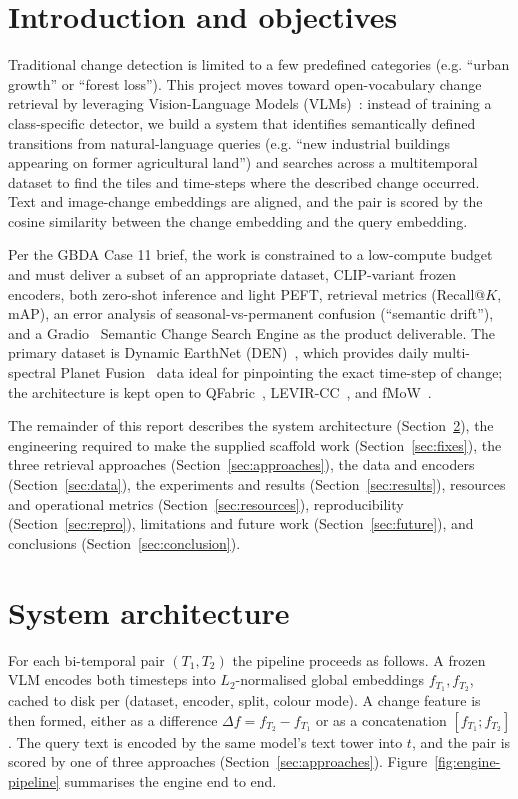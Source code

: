 \documentclass{article}
\begin{document}
\section{Introduction and objectives}

Traditional change detection is limited to a few predefined categories
(e.g. ``urban growth'' or ``forest loss''). This project moves toward
open-vocabulary change retrieval by leveraging Vision-Language Models
(VLMs)~\cite{clip}: instead of training a class-specific detector, we build a system that
identifies semantically defined transitions from natural-language queries
(e.g. ``new industrial buildings appearing on former agricultural
land'') and searches across a multitemporal dataset to find the tiles and
time-steps where the described change occurred. Text and image-change
embeddings are aligned, and the pair is scored by the cosine similarity between
the change embedding and the query embedding.

Per the GBDA Case 11 brief, the work is constrained to a low-compute
budget and must deliver a subset of an appropriate dataset, CLIP-variant
frozen encoders, both zero-shot inference and light PEFT,
retrieval metrics (Recall@$K$, mAP), an error analysis of seasonal-vs-permanent
confusion (``semantic drift''), and a Gradio~\cite{gradio} Semantic Change Search
Engine as the product deliverable. The primary dataset is Dynamic
EarthNet (DEN)~\cite{dynamicearthnet}, which provides daily multi-spectral Planet
Fusion~\cite{planetfusion} data ideal
for pinpointing the exact time-step of change; the architecture is kept open to
QFabric~\cite{qfabric}, LEVIR-CC~\cite{levircc}, and fMoW~\cite{fmow}.

The remainder of this report describes the system architecture
(Section~\ref{sec:arch}), the engineering required to make the supplied
scaffold work (Section~\ref{sec:fixes}), the three retrieval approaches
(Section~\ref{sec:approaches}), the data and encoders (Section~\ref{sec:data}),
the experiments and results (Section~\ref{sec:results}), resources and
operational metrics (Section~\ref{sec:resources}), reproducibility
(Section~\ref{sec:repro}), limitations and future work
(Section~\ref{sec:future}), and conclusions (Section~\ref{sec:conclusion}).


\section{System architecture}
\label{sec:arch}

For each bi-temporal pair $(T_1, T_2)$ the pipeline proceeds as follows. A frozen
VLM encodes both timesteps into $L_2$-normalised global embeddings
$f_{T_1}, f_{T_2}$, cached to disk per (dataset, encoder, split, colour mode).
A change feature is then formed, either as a difference
$\Delta f = f_{T_2} - f_{T_1}$ or as a concatenation $[f_{T_1} ; f_{T_2}]$. The
query text is encoded by the same model's text tower into $t$, and the pair is
scored by one of three approaches (Section~\ref{sec:approaches}). Figure~\ref{fig:engine-pipeline}
summarises the engine end to end.
\end{document}
